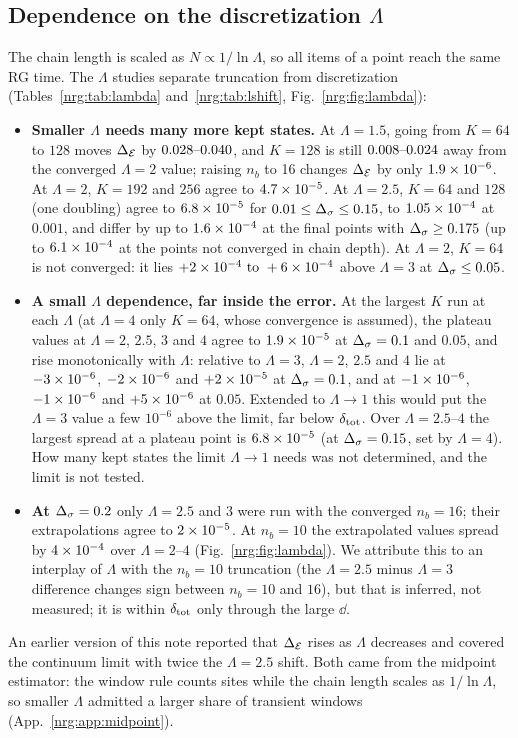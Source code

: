 \subsection{Dependence on the discretization \texorpdfstring{$\Lambda$}{Lambda}}\label{nrg:sec:lambda}
The chain length is scaled as $N\propto1/\ln\Lambda$, so all items of a point reach the same RG time. The $\Lambda$ studies separate
truncation from discretization (Tables~\ref{nrg:tab:lambda} and~\ref{nrg:tab:lshift}, Fig.~\ref{nrg:fig:lambda}):
\begin{itemize}
\item \textbf{Smaller $\Lambda$ needs many more kept states.} At $\Lambda=1.5$, going from $K=64$ to $128$ moves $\Delta_{\mathcal E}$ by
  $0.028\text{--}0.040$, and $K=128$ is still $0.008\text{--}0.024$ away from the converged $\Lambda=2$ value; raising $n_b$ to 16 changes
  $\Delta_{\mathcal E}$ by only $1.9\times10^{-6}$. At $\Lambda=2$, $K=192$ and $256$ agree to $4.7\times10^{-5}$. At $\Lambda=2.5$, $K=64$ and $128$ (one
  doubling) agree to $6.8\times10^{-5}$ for $0.01\le\Delta_\sigma\le0.15$, to $1.05\times10^{-4}$ at $0.001$, and differ by up to $1.6\times10^{-4}$
  at the final points with $\Delta_\sigma\ge0.175$ (up to $6.1\times10^{-4}$ at the points not converged in chain depth). At $\Lambda=2$, $K=64$ is not converged: it lies $+2\times10^{-4}\text{ to }+6\times10^{-4}$ above $\Lambda=3$ at $\Delta_\sigma\le0.05$.
\item \textbf{A small $\Lambda$ dependence, far inside the error.} At the largest $K$ run at each $\Lambda$ (at $\Lambda=4$ only
  $K=64$, whose convergence is assumed), the plateau values at $\Lambda=2$, $2.5$, $3$ and $4$ agree to $1.9\times10^{-5}$ at $\Delta_\sigma=0.1$ and $0.05$, and rise monotonically with $\Lambda$: relative to $\Lambda=3$, $\Lambda=2$,
  $2.5$ and $4$ lie at $-3\times10^{-6}$, $-2\times10^{-6}$ and $+2\times10^{-5}$ at $\Delta_\sigma=0.1$, and at $-1\times10^{-6}$,
  $-1\times10^{-6}$ and $+5\times10^{-6}$ at $0.05$. Extended to $\Lambda\to1$ this would put the $\Lambda=3$ value a few $10^{-6}$ above
  the limit, far below $\delta_{\rm tot}$. Over $\Lambda=2.5$--$4$ the largest spread at a plateau point is $6.8\times10^{-5}$ (at
  $\Delta_\sigma=0.15$, set by $\Lambda=4$). How many kept states the limit $\Lambda\to1$ needs was not determined, and the limit
  is not tested.
\item \textbf{At $\Delta_\sigma=0.2$} only $\Lambda=2.5$ and $3$ were run with the converged $n_b=16$; their extrapolations agree to
  $2\times10^{-5}$. At $n_b=10$ the extrapolated values spread by $4\times10^{-4}$ over $\Lambda=2$--$4$
  (Fig.~\ref{nrg:fig:lambda}). We attribute this to an interplay of $\Lambda$ with the $n_b=10$ truncation (the $\Lambda=2.5$ minus
  $\Lambda=3$ difference changes sign between $n_b=10$ and $16$), but that is inferred, not measured; it is within $\delta_{\rm tot}$ only through
  the large $\dd$.
\end{itemize}
An earlier version of this note reported that $\Delta_{\mathcal E}$ rises as $\Lambda$ decreases and covered the continuum limit with twice the
$\Lambda=2.5$ shift. Both came from the midpoint estimator: the window rule counts sites while the chain length scales as
$1/\ln\Lambda$, so smaller $\Lambda$ admitted a larger share of transient windows (App.~\ref{nrg:app:midpoint}).

